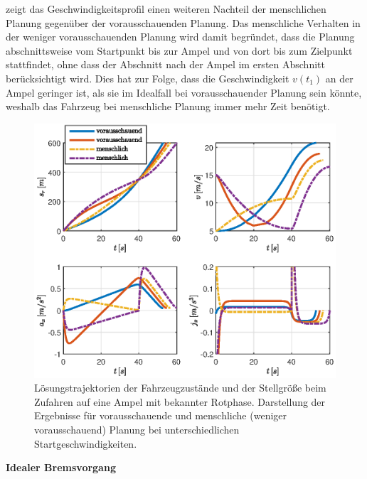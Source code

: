 zeigt das Geschwindigkeitsprofil einen weiteren Nachteil der menschlichen Planung gegenüber der vorausschauenden Planung. Das menschliche Verhalten in der weniger vorausschauenden Planung wird damit begründet, dass die Planung abschnittsweise vom Startpunkt bis zur Ampel und von dort bis zum Zielpunkt stattfindet, ohne dass der Abschnitt nach der Ampel im ersten Abschnitt berücksichtigt wird. Dies hat zur Folge, dass die Geschwindigkeit $v(t_1)$ an der Ampel geringer ist, als sie im Idealfall bei vorausschauender Planung sein könnte, weshalb das Fahrzeug bei menschliche Planung immer mehr Zeit benötigt.
\begin{figure}[h] 
	\centering
	\includegraphics[width=\linewidth]{./Bilder/Ergebnisse/Geradeausfahrt/Ampel/v_5_v_15/svaj_zoomj.eps}
	\caption{Lösungstrajektorien der Fahrzeugzustände und der Stellgröße beim Zufahren auf eine Ampel mit bekannter Rotphase. Darstellung der Ergebnisse für vorausschauende und menschliche (weniger vorausschauend) Planung bei unterschiedlichen Startgeschwindigkeiten.}
	\label{fig:svaj_zoomj}
\end{figure} 

\textbf{Idealer Bremsvorgang}


